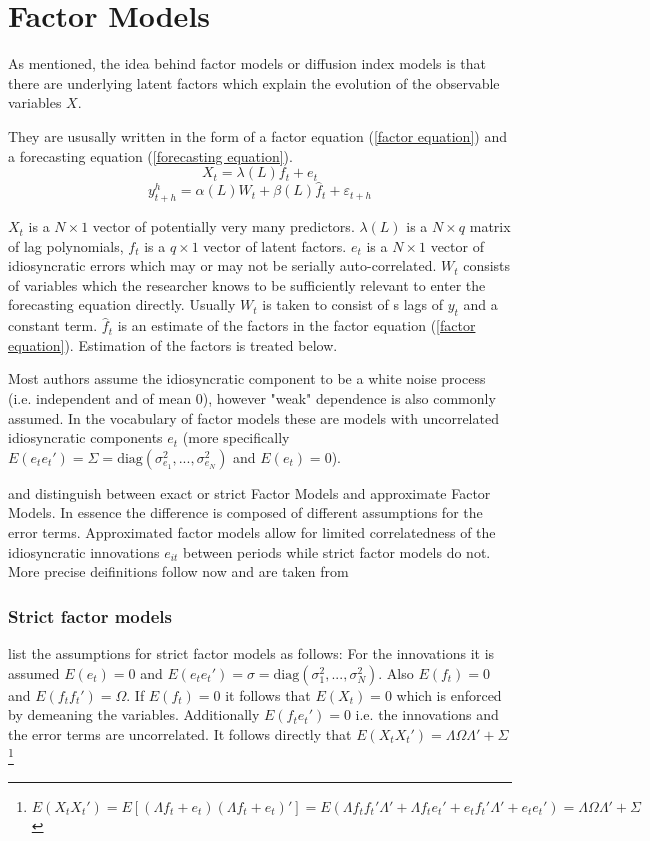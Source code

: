 \documentclass[11pt]{article}
\begin{document}
\section{Factor Models}
As mentioned, the idea behind factor models or diffusion index models is that there are underlying latent factors which explain the evolution of the observable variables $X$. 

They are ususally written in the form of a factor equation (\ref{factor equation}) and a forecasting equation (\ref{forecasting equation}). 
\begin{equation}
	\label{factor equation}
	X_t = \lambda(L) f_t + e_t
\end{equation}
\begin{equation}
	\label{forecasting equation}
	y^h_{t+h} = \alpha(L) W_t + \beta(L) \hat f_t + \varepsilon_{t+h}
\end{equation}
	
$X_t$ is a $N \times 1$ vector of potentially very many predictors. $\lambda(L)$ is a $N \times q$ matrix of lag polynomials, $f_t$ is a $q \times 1$ vector of latent factors. $e_t$ is a $N \times 1$ vector of idiosyncratic errors which may or may not be serially auto-correlated. $W_t$ consists of variables which the researcher knows to be sufficiently relevant to enter the forecasting equation directly. Usually $W_t$ is taken to consist of s lags of $y_t$ and a constant term. $\hat f_t$ is an estimate of the factors in the factor equation (\ref{factor equation}). Estimation of the factors is treated below.

Most authors assume the idiosyncratic component to be a white noise process (i.e. independent and of mean 0), however "weak" dependence is also commonly assumed. In the vocabulary of factor models these are models with uncorrelated idiosyncratic components $e_t$ (more specifically $E(e_t e_t') = \Sigma = \text{diag}(\sigma_{e_1}^2, ..., \sigma_{e_N}^2)$ and $E(e_t) = 0$).

\citet{geweke1977dynamic} and \citet{sargent1977business} distinguish between exact or strict Factor Models and approximate Factor Models. In essence the difference is composed of different assumptions for the error terms. Approximated factor models allow for limited correlatedness of the idiosyncratic innovations $e_{it}$ between periods while strict factor models do not. More precise deifinitions follow now and are taken from \citet{breitung2006dynamic}
\subsubsection*{Strict factor models}
\citet{breitung2006dynamic} list the assumptions for strict factor models as follows: For the innovations it is assumed $E(e_t) = 0$ and $E(e_te_t') = \sigma = \text{diag}(\sigma_1^2, ..., \sigma_N^2)$. Also $E(f_t) = 0$ and $E(f_tf_t') = \Omega$. If $E(f_t) = 0$ it follows that $E(X_t) = 0$ which is enforced by demeaning the variables. Additionally $E(f_t e_t') = 0$ i.e. the innovations and the error terms are uncorrelated. It follows directly that $E(X_tX_t') = \Lambda \Omega \Lambda' + \Sigma$\footnote{$E(X_tX_t') = E[(\Lambda f_t +e_t) (\Lambda f_t + e_t)'] = E(\Lambda f_t f_t' \Lambda' + \Lambda f_t e_t' + e_t f_t' \Lambda' + e_t e_t') = \Lambda \Omega \Lambda' + \Sigma$}
\end{document}
